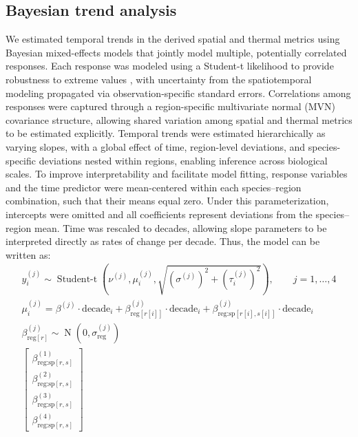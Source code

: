 \documentclass[9pt,twocolumn,twoside]{pnas-new}
\begin{document}
{\subsection*{Bayesian trend analysis}\label{sec:Bayesian trend analysis}

We estimated temporal trends in the derived spatial and thermal metrics using Bayesian mixed-effects models that jointly model multiple, potentially correlated responses. Each response was modeled using a Student-t likelihood to provide robustness to extreme values \citep[e.g.,][]{anderson_black-swan_2017}, with uncertainty from the spatiotemporal modeling propagated via observation-specific standard errors. Correlations among responses were captured through a region-specific multivariate normal (MVN) covariance structure, allowing shared variation among spatial and thermal metrics to be estimated explicitly. Temporal trends were estimated hierarchically as varying slopes, with a global effect of time, region-level deviations, and species-specific deviations nested within regions, enabling inference across biological scales. To improve interpretability and facilitate model fitting, response variables and the time predictor were mean-centered within each species–region combination, such that their means equal zero. Under this parameterization, intercepts were omitted and all coefficients represent deviations from the species–region mean. Time was rescaled to decades, allowing slope parameters to be interpreted directly as rates of change per decade.
Thus, the model can be written as:
\begin{gather}
y_{i}^{(j)} \sim \operatorname{Student\text{-}t}
\left(\nu^{(j)}, 
\mu_{i}^{(j)}, 
\sqrt{(\sigma^{(j)})^{2} + (\tau^{(j)}_{i})^{2}}
\right),
\qquad j=1,\dots,4 \label{eq:likelihood}
\\
\mu_{i}^{(j)} =
\beta^{(j)} \cdot \text{decade}_{i}
+ \beta_{\text{reg}[r[i]]}^{(j)} \cdot \text{decade}_{i}
+ \beta_{\text{reg:sp}[r[i],s[i]]}^{(j)} \cdot \text{decade}_{i} \label{eq:linearpred}
\\
\beta_{\text{reg}[r]}^{(j)} \sim 
\operatorname{N}\!\left(0,\sigma_{\text{reg}}^{(j)}\right) \label{eq:regionslope}
\\
\begin{bmatrix}
\beta_{\text{reg:sp}[r,s]}^{(1)} \\
\beta_{\text{reg:sp}[r,s]}^{(2)} \\
\beta_{\text{reg:sp}[r,s]}^{(3)} \\
\beta_{\text{reg:sp}[r,s]}^{(4)}
\end{bmatrix}

\end{gather}}
\end{document}
